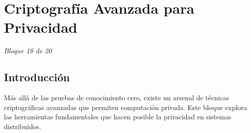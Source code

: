 \documentclass[11pt,a4paper,twoside]{book}
\theoremstyle{definition}
\theoremstyle{remark}
\renewcommand{\cleardoublepage}{\clearpage}
\begin{document}
\cleardoublepage


\chapter{Criptografía Avanzada para Privacidad}
\label{ch:bloque18}

\begin{center}
\textit{Bloque 18 de 20}
\end{center}

\section*{Introducción}

Más allá de las pruebas de conocimiento cero, existe un arsenal de técnicas criptográficas avanzadas que permiten computación privada. Este bloque explora las herramientas fundamentales que hacen posible la privacidad en sistemas distribuidos.
\end{document}
